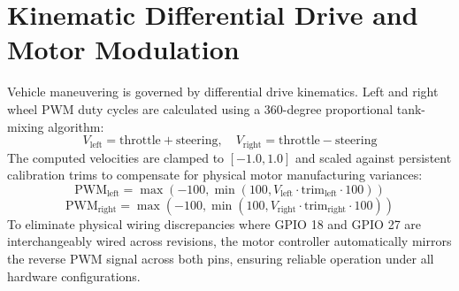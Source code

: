 \section{Kinematic Differential Drive and Motor Modulation}
Vehicle maneuvering is governed by differential drive kinematics. Left and right wheel PWM duty cycles are calculated using a 360-degree proportional tank-mixing algorithm:
\begin{equation}
V_{\text{left}} = \text{throttle} + \text{steering}, \quad V_{\text{right}} = \text{throttle} - \text{steering}
\end{equation}
The computed velocities are clamped to $[-1.0, 1.0]$ and scaled against persistent calibration trims to compensate for physical motor manufacturing variances:
\begin{equation}
\text{PWM}_{\text{left}} = \max(-100, \min(100, V_{\text{left}} \cdot \text{trim}_{\text{left}} \cdot 100))
\end{equation}
\begin{equation}
\text{PWM}_{\text{right}} = \max(-100, \min(100, V_{\text{right}} \cdot \text{trim}_{\text{right}} \cdot 100))
\end{equation}
To eliminate physical wiring discrepancies where GPIO 18 and GPIO 27 are interchangeably wired across revisions, the motor controller automatically mirrors the reverse PWM signal across both pins, ensuring reliable operation under all hardware configurations.
